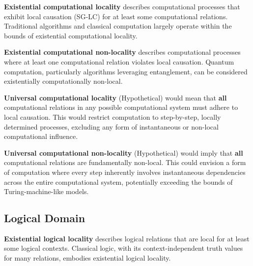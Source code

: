 	\begin{definition}
		\textbf{Existential computational locality} describes computational processes that exhibit local causation (SG-LC) for at least some computational relations.  Traditional algorithms and classical computation largely operate within the bounds of existential computational locality.
	\end{definition}
	
	\begin{definition}
		\textbf{Existential computational non-locality} describes computational processes where at least one computational relation violates local causation. Quantum computation, particularly algorithms leveraging entanglement, can be considered existentially computationally non-local.
	\end{definition}
	
	\begin{definition}
		\textbf{Universal computational locality} (Hypothetical) would mean that \textbf{all} computational relations in any possible computational system must adhere to local causation. This would restrict computation to step-by-step, locally determined processes, excluding any form of instantaneous or non-local computational influence.
	\end{definition}
	
	\begin{definition}
		\textbf{Universal computational non-locality} (Hypothetical) would imply that \textbf{all} computational relations are fundamentally non-local.  This could envision a form of computation where every step inherently involves instantaneous dependencies across the entire computational system, potentially exceeding the bounds of Turing-machine-like models.
	\end{definition}
	
	\subsection{Logical Domain}

	\begin{definition}
		\textbf{Existential logical locality} describes logical relations that are local for at least some logical contexts. Classical logic, with its context-independent truth values for many relations, embodies existential logical locality.
	\end{definition}
	
